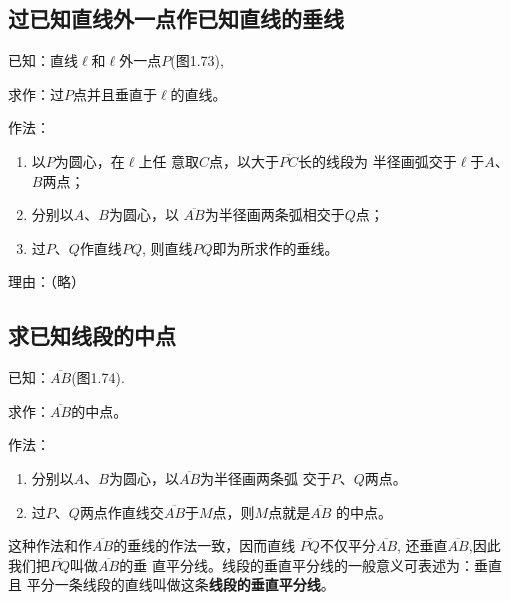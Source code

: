 \subsection{过已知直线外一点作已知直线的垂线}
已知：直线$\ell$和$\ell$外一点$P$(图1.73),

求作：过$P$点并且垂直于$\ell$的直线。

作法：
\begin{enumerate}
\item 以$P$为圆心，在$\ell$上任
意取$C$点，以大于$\overline{PC}$长的线段为
半径画弧交于$\ell$于$A$、$B$两点；
\item 分别以$A$、$B$为圆心，以
$\overline{AB}$为半径画两条弧相交于$Q$点；
\item 过$P$、$Q$作直线$PQ$, 则直线$PQ$即为所求作的垂线。
\end{enumerate}

理由：（略）

\subsection{求已知线段的中点}

已知：$\overline{AB}$(图1.74).

求作：$\overline{AB}$的中点。

作法：
\begin{enumerate}
\item 分别以$A$、$B$为圆心，以$\overline{AB}$为半径画两条弧
交于$P$、$Q$两点。
\item 过$P$、$Q$两点作直线交$\overline{AB}$于$M$点，则$M$点就是$\overline{AB}$
的中点。
\end{enumerate}

\begin{rmk}
	这种作法和作$\overline{AB}$的垂线的作法一致，因而直线
	$\overline{PQ}$不仅平分$\overline{AB}$, 还垂直$\overline{AB}$,因此我们把$\overline{PQ}$叫做$\overline{AB}$的垂
直平分线。线段的垂直平分线的一般意义可表述为：垂直且
平分一条线段的直线叫做这条\textbf{线段的垂直平分线}。
\end{rmk}


